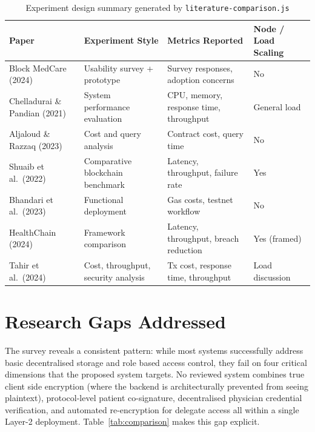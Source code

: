 \documentclass[12pt,a4wide]{report}
\begin{document}
\begin{table}[H]
\centering
\footnotesize
\setlength{\tabcolsep}{5pt}
\renewcommand{\arraystretch}{1.2}

\caption{Experiment design summary generated by \texttt{literature-comparison.js}}
\label{tab:litmap}

\begin{tabular}{@{}p{3.8cm}p{3.8cm}p{4.2cm}p{2.5cm}@{}}
\toprule
\textbf{Paper} & \textbf{Experiment Style} & \textbf{Metrics Reported} & \textbf{Node / Load Scaling} \\
\midrule

Block MedCare (2024) 
& Usability survey + prototype 
& Survey responses, adoption concerns 
& No \\

Chelladurai \& Pandian (2021) 
& System performance evaluation 
& CPU, memory, response time, throughput 
& General load \\

Aljaloud \& Razzaq (2023) 
& Cost and query analysis 
& Contract cost, query time 
& No \\

Shuaib et al.\ (2022) 
& Comparative blockchain benchmark 
& Latency, throughput, failure rate 
& Yes \\

Bhandari et al.\ (2023) 
& Functional deployment 
& Gas costs, testnet workflow 
& No \\

HealthChain (2024) 
& Framework comparison 
& Latency, throughput, breach reduction 
& Yes (framed) \\

Tahir et al.\ (2024) 
& Cost, throughput, security analysis 
& Tx cost, response time, throughput 
& Load discussion \\

\bottomrule
\end{tabular}
\end{table}

\section{Research Gaps Addressed}

The survey reveals a consistent pattern: while most systems successfully address
basic decentralised storage and role based access control, they fail on four
critical dimensions that the proposed system targets. No reviewed system combines true
client side encryption (where the backend is architecturally prevented from seeing
plaintext), protocol-level patient co-signature, decentralised physician credential
verification, and automated re-encryption for delegate access all within a
single Layer-2 deployment. Table~\ref{tab:comparison} makes this gap explicit.
\end{document}

